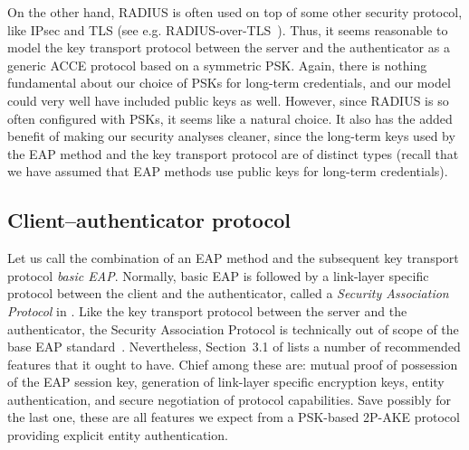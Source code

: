On the other hand,
RADIUS is often used on top of some other security protocol,
like IPsec and TLS
(see e.g. RADIUS-over-TLS~\cite{IETF:RFC6614:RADIUS_over_TLS}).
Thus,
it seems reasonable to model the key transport protocol between the server and the authenticator as a generic ACCE protocol based on  a symmetric PSK.
Again,
there is nothing fundamental about our choice of PSKs for long-term credentials,
and our model could very well have included public keys as well.
However,
since RADIUS is so often configured with PSKs,
it seems like a natural choice.
It also has the added benefit of making our security analyses cleaner,
since the long-term keys used by the EAP method and the key transport protocol are of distinct types
(recall that we have assumed that EAP methods use public keys for long-term credentials).  




\subsection{Client--authenticator protocol}\label{sec:generic_composition_results:modeling_EAP:link-layer}

Let us call the combination of an EAP method and the subsequent key transport protocol \emph{basic EAP}.
Normally,
basic EAP is followed by a link-layer specific protocol between the client and the authenticator,
called a \emph{Security Association Protocol} in \cite{IETF:RFC5247:EAP-key-management}.
Like the key transport protocol between the server and the authenticator,
the Security Association Protocol is technically out of scope of the base EAP standard~\cite{IETF:RFC3748:EAP}.
Nevertheless,
Section~3.1 of \cite{IETF:RFC5247:EAP-key-management} lists a number of recommended features that it ought to have.
Chief among these are:
mutual proof of possession of the EAP session key,
generation of link-layer specific encryption keys,
entity authentication,
and secure negotiation of protocol capabilities.
Save possibly for the last one,
these are all features we expect from a PSK-based 2P-AKE protocol providing explicit entity authentication.

